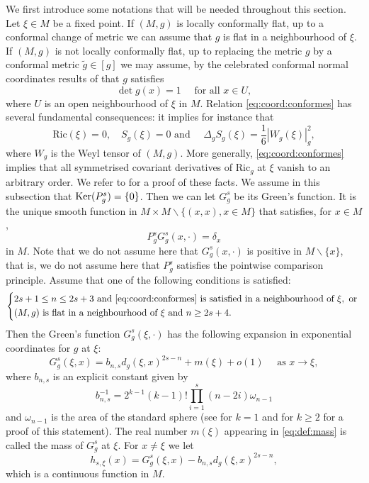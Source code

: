 \documentclass[10pt]{amsart}
\numberwithin{equation}{section}
\def\ker{{\mathop{\rm Ker}}}
\theoremstyle{plain}
\theoremstyle{remark}
\begin{document}
We first introduce some notations that will be needed throughout this section. Let $\xi \in M$ be a fixed point. If $(M,g)$ is locally conformally flat, up to a conformal change of metric we can assume that $g$ is flat in a neighbourhood of $\xi$. If $(M,g)$ is not locally conformally flat, up to replacing the metric $g$ by a conformal metric $\tilde g \in [g]$ we may assume, by the celebrated  conformal normal coordinates results of \cite{Cao, Gunther, LeeParker} that $g$ satisfies 
\begin{equation} \label{eq:coord:conformes}
 \det g(x) = 1 \quad \text{ for all } x \in U,
 \end{equation}
where $U$ is an open neighbourhood of $\xi$ in $M$. Relation \eqref{eq:coord:conformes} has several fundamental consequences: it implies for instance that 
$$\text{Ric}(\xi) = 0, \quad  S_g(\xi) = 0 \text{ and } \quad \Delta_g S_g(\xi) = \frac{1}{6} |W_g(\xi)|_g^2,$$
 where $W_g$ is the Weyl tensor of $(M,g)$. More generally, \eqref{eq:coord:conformes} implies that all symmetrised covariant derivatives of $\text{Ric}_g$ at $\xi$ vanish to an arbitrary order. We refer to \cite{LeeParker} for a proof of these facts. We assume in this subsection that $\ker (P_g^s) = \{0\}$. Then we can let $G_g^s$ be its Green's function. It is the unique smooth function in $M \times M \backslash \{ (x,x), x \in M\}$ that satisfies, for $x \in M$, 
 $$ P_g^s G_g^s(x, \cdot) = \delta_x$$
  in $M$. Note that we do not assume here that $G_{g}^s(x, \cdot)$ is positive in $M \backslash \{x\}$, that is, we do not assume here that $P_g^s$ satisfies the pointwise comparison principle. Assume that one of the following conditions is satisfied: 
  \begin{equation} \label{eq:hyp:masse} \left \{
  \begin{aligned}
& 2s+1 \le n \le 2s+3 \text{ and } \eqref{eq:coord:conformes} \text{ is satisfied in a neighbourhood of } \xi, \text{ or } \\   
& (M,g) \text{ is flat in a neighbourhood of } \xi \text{ and } n \ge 2s + 4.
  \end{aligned}
  \right. \end{equation}
 Then the Green's function $G_g^s(\xi, \cdot)$ has the following expansion in exponential coordinates for $g$ at $\xi$:
 \begin{equation} \label{eq:def:mass}
 G_g^s(\xi, x) = b_{n,s} d_g(\xi,x)^{2s-n} + m(\xi) + o(1) \quad \text{ as } x \to \xi,
 \end{equation}
 where $b_{n,s}$ is an explicit constant given by 
 $$b_{n,s}^{-1} = 2^{k-1} (k-1)! \prod_{i=1}^s (n-2i) \omega_{n-1}$$
  and $\omega_{n-1}$ is the area of the standard sphere (see \cite{LeeParker} for $k=1$ and \cite{Michel} for $k \ge 2$ for a proof of this statement). The real number $m(\xi)$ appearing in \eqref{eq:def:mass} is called the mass of $G_g^s$ at $\xi$. For $x \neq \xi$ we let 
  \begin{equation} \label{eq:def:robin}
  h_{s,\xi}(x) = G_g^s(\xi, x) - b_{n,s} d_g(\xi,x)^{2s-n},
  \end{equation}
  which is a continuous function in $M$. 
 
\end{document}

